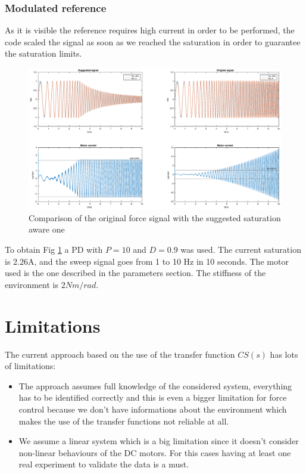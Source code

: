 \documentclass[a4paper,11pt]{article}
\begin{document}
\subsubsection{Modulated reference}
\noindent As it is visible the reference requires high current in order to be performed, the code scaled the signal as soon as we reached the saturation in order to guarantee the saturation limits.
\begin{figure}[H]
  \begin{center}
  \hspace*{-5cm}
  \includegraphics[width=1.6\textwidth]{images/force_tau.eps}
  \end{center}
  \caption{Comparison of the original force signal with the suggested saturation aware one}
  \label{fig:force_tau}
  \end{figure}

  To obtain Fig \ref{fig:force_tau} a PD with $P = 10$ and $D = 0.9$ was used. The current saturation is $2.26$A, and the sweep signal goes from 1 to 10 Hz in 10 seconds. The motor used is the one described in the parameters section. The stiffness of the environment is $2Nm/rad$.

\section{Limitations}

The current approach based on the use of the transfer function $CS(s)$ has lots of limitations:
\begin{itemize}
  \item The approach assumes full knowledge of the considered system, everything has to be identified correctly and this is even a bigger limitation for force control because we don't have informations about the environment which makes the use of the transfer functions not reliable at all.
  \item We assume a linear system which is a big limitation since it doesn't consider non-linear behaviours of the DC motors. For this cases having at least one real experiment to validate the data is a must.
\end{itemize}
\end{document}
